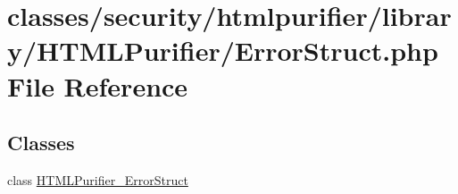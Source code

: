 \hypertarget{ErrorStruct_8php}{\section{classes/security/htmlpurifier/library/\+H\+T\+M\+L\+Purifier/\+Error\+Struct.php File Reference}
\label{ErrorStruct_8php}
}
\subsection*{Classes}
\begin{DoxyCompactItemize}
\item 
class \hyperlink{classHTMLPurifier__ErrorStruct}{H\+T\+M\+L\+Purifier\+\_\+\+Error\+Struct}
\end{DoxyCompactItemize}
